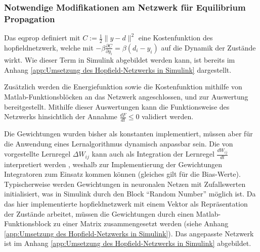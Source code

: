 \subsubsection{Notwendige Modifikationen am Netzwerk für Equilibrium Propagation}

Das \gls{eqprop} definiert mit \(C:=\frac{1}{2}\| y-d\| ^2\) eine Kostenfunktion des \gls{hopfieldnetzwerk}, welche mit \(-\beta\frac{\partial C}{\partial y_i}=\beta(d_i-y_i)\) auf die Dynamik der Zustände wirkt. Wie dieser Term in Simulink abgebildet werden kann, ist bereits im Anhang \ref{app:Umsetzung des Hopfield-Netzwerks in Simulink} dargestellt.

Zusätzlich werden die Energiefunktion sowie die Kostenfunktion mithilfe von Matlab-Funktionsblöcken an das Netzwerk angeschlossen, und zur Auswertung bereitgestellt. Mithilfe dieser Auswertungen kann die Funktionsweise des Netzwerks hinsichtlich der Annahme \(\frac{dF}{dt}\leq{0}\) \cite[vgl. S. 3]{Scellier2017} validiert werden.

Die Gewichtungen wurden bisher als konstanten implementiert, müssen aber für die Anwendung eines Lernalgorithmus dynamisch anpassbar sein. Die von \citeauthor{Scellier2017} vorgestellte Lernregel \(\Delta W_{ij}\) kann auch als Integration der Lernregel \(\frac{dW_{ij}}{dt}\) interpretiert werden \cite[vgl. S. 5]{Scellier2017}, weshalb zur Implementierung der Gewichtungen Integratoren zum Einsatz kommen können (gleiches gilt für die Bias-Werte). Typischerweise werden Gewichtungen in neuronalen Netzen mit Zufallswerten initialisiert, was in Simulink durch den Block "`Random Number"' möglich ist. Da das hier implementierte \gls{hopfieldnetzwerk} mit einem Vektor als Repräsentation der Zustände arbeitet, müssen die Gewichtungen durch einen Matlab-Funktionsblock zu einer Matrix zusammengesetzt werden (siehe Anhang \ref{app:Umsetzung des Hopfield-Netzwerks in Simulink}). Das angepasste Netzwerk ist im Anhang \ref{app:Umsetzung des Hopfield-Netzwerks in Simulink} abgebildet.

